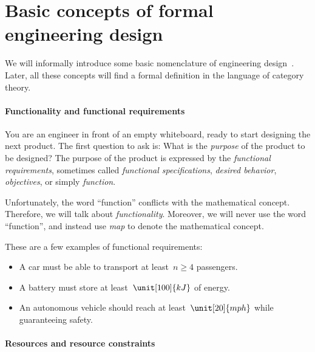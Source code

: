 
\section[Formal engineering design]{Basic concepts of formal engineering design}


We will informally introduce some basic nomenclature of engineering design~\cite{antonsson2005formal,deweck2011}.
Later, all these concepts will find a formal definition in the language of category theory.

\paragraph{Functionality and functional requirements}
You are an engineer in front of an empty whiteboard, ready to start designing the next product.
The first question to ask is: What is the \emph{purpose} of the product to be designed?
The purpose of the product is expressed by the \emph{functional requirements}, sometimes called
\emph{functional specifications}, \emph{desired behavior}, \emph{objectives}, or simply \emph{function}.

Unfortunately, the word ``function'' conflicts with the mathematical concept.
Therefore, we will talk about \emph{functionality}.
Moreover, we will never use the word ``function'', and instead use \emph{map} to denote the mathematical concept.

\begin{example}
    These are a few examples of functional requirements:
    \begin{itemize}
        \item A car must be able to transport at least~$n \geq 4$ passengers.
        \item A battery must store at least~$\unit[100]{kJ}$ of energy.
        \item An autonomous vehicle should reach at least~$\unit[20]{mph}$ while guaranteeing safety.
    \end{itemize}
\end{example}

\paragraph{Resources and resource constraints}

